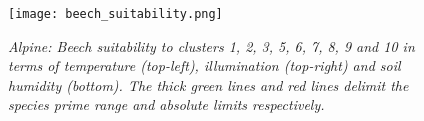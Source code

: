 \begin{figure}[htb!]
\center
	\texttt{[image: beech\_suitability.png]}
	\caption{ \textit{Alpine: Beech suitability to clusters 1, 2, 3, 5, 6, 7, 8, 9 and 10 in terms of temperature (top-left), illumination (top-right) and soil humidity (bottom). The thick green lines and red lines delimit the species prime range and absolute limits respectively.}}
	\label{fig:results_alpine_beech_suitability}
\end{figure}